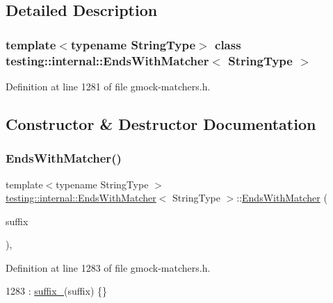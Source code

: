 \subsection{Detailed Description}
\subsubsection*{template$<$typename String\+Type$>$\newline
class testing\+::internal\+::\+Ends\+With\+Matcher$<$ String\+Type $>$}



Definition at line 1281 of file gmock-\/matchers.\+h.



\subsection{Constructor \& Destructor Documentation}
\mbox{\label{classtesting_1_1internal_1_1EndsWithMatcher_a38726091c8767c2d8a15abf2a8c2018a}} 
\subsubsection{\texorpdfstring{Ends\+With\+Matcher()}{EndsWithMatcher()}}
{\footnotesize\ttfamily template$<$typename String\+Type $>$ \\
\hyperlink{classtesting_1_1internal_1_1EndsWithMatcher}{testing\+::internal\+::\+Ends\+With\+Matcher}$<$ String\+Type $>$\+::\hyperlink{classtesting_1_1internal_1_1EndsWithMatcher}{Ends\+With\+Matcher} (\begin{DoxyParamCaption}\item[{const String\+Type \&}]{suffix }\end{DoxyParamCaption})\hspace{0.3cm}{\ttfamily [inline]}, {\ttfamily [explicit]}}



Definition at line 1283 of file gmock-\/matchers.\+h.


\begin{DoxyCode}
1283 : \hyperlink{classtesting_1_1internal_1_1EndsWithMatcher_a66f75082cf1041cd328c01b47acf8350}{suffix\_}(suffix) \{\}
\end{DoxyCode}


